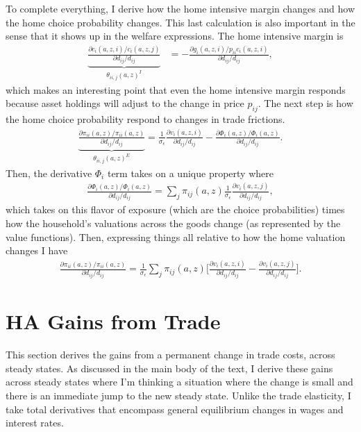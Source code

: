 \documentclass[12pt,pdftex]{article}
\begin{document}
\begin{onehalfspacing}
To complete everything, I derive how the home intensive margin changes and how the home choice probability changes. This last calculation is also important in the sense that it shows up in the welfare expressions. The home intensive margin is
\begin{align}
\underbrace{\frac{\partial c_{i}(a,z,i)/ c_{i}(a,z,j)}{\partial d_{ij} / d_{ij}}}_{\theta_{ii,j}(a,z)^{I}} &= -\frac{\partial g_{i}(a,z,i)/ p_{ii}c_{i}(a,z,i)}{\partial d_{ij}/ d_{ij}},
\end{align}
which makes an interesting point that even the home intensive margin responds because asset holdings will adjust to the change in price $p_{ij}$. The next step is how the home choice probability respond to changes in trade frictions.
\begin{align}
\underbrace{\frac{\partial \pi_{ii}(a,z) / \pi_{ii}(a,z) }{\partial d_{ij} / d_{ij}}}_{\theta_{ii,j}(a,z)^{E}} = \frac{1}{\sigma_{\epsilon}}\frac{\partial v_{i}(a,z,i)}{\partial d_{ij}/d_{ij}} - \frac{\partial \Phi_{i}(a,z) / \Phi_{i}(a,z)}{\partial d_{ij}/d_{ij}}.
\end{align}
Then, the derivative $\Phi_{i}$ term takes on a unique property where
\begin{align}
\frac{\partial \Phi_{i}(a,z) / \Phi_{i}(a,z)}{\partial d_{ij}/d_{ij}} = \sum_{j} \pi_{ij}(a,z) \frac{1}{\sigma_{\epsilon}}\frac{\partial v_{i}(a,z,j)}{\partial d_{ij}/d_{ij}},
\end{align}
which takes on this flavor of exposure (which are the choice probabilities) times how the household's valuations across the goods change (as represented by the value functions). Then, expressing things all relative to how the home valuation changes I have
\begin{align}
\frac{\partial \pi_{ii}(a,z) / \pi_{ii}(a,z) }{\partial d_{ij} / d_{ij}} = \frac{1}{\sigma_{\epsilon}} \sum_{j} \pi_{ij}(a,z) \bigg[ \frac{\partial v_{i}(a,z,i)}{\partial d_{ij}/d_{ij}} - \frac{\partial v_{i}(a,z,j)}{\partial d_{ij}/d_{ij}} \bigg].
\label{eq:apx-change-home-choice}
\end{align}

\section{HA Gains from Trade}\label{apx-sec:gains-trade}


This section derives the gains from a permanent change in trade costs, across steady states. As discussed in the main body of the text, I derive these gains across steady states where I'm thinking a situation where the change is small and there is an immediate jump to the new steady state.  Unlike the trade elasticity, I take total derivatives that encompass general equilibrium changes in wages and interest rates.


\end{onehalfspacing}
\end{document}
